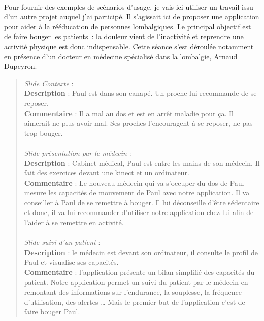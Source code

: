 \paragraph{}Pour fournir des exemples de scénarios d'usage, je vais ici utiliser un travail issu d'un autre projet auquel j'ai participé. Il s'agissait ici de proposer une application pour aider à la rééducation de personnes lombalgiques. Le principal objectif est de faire bouger les patients~: la douleur vient de l'inactivité et reprendre une activité physique est donc indispensable. Cette séance s'est déroulée notamment en présence d'un docteur en médecine spécialisé dans la lombalgie, Arnaud Dupeyron.

\begin{quotation}
	\emph{Slide Contexte} :\\
	\textbf{Description} : Paul est dans son canapé. Un proche lui recommande de se reposer.\\
	\textbf{Commentaire} : Il a mal au dos et est en arrêt maladie pour ça. Il aimerait ne plus avoir mal. Ses proches l’encouragent à se reposer, ne pas trop bouger.
	\paragraph{}
	\emph{Slide présentation par le médecin} :\\
	\textbf{Description} : Cabinet médical, Paul est entre les mains de son médecin. Il fait des exercices devant une kinect et un ordinateur.\\
	\textbf{Commentaire} : Le nouveau médecin qui va s’occuper du dos de Paul mesure les capacités de mouvement de Paul avec notre application. Il va conseiller à Paul de se remettre à bouger. Il lui déconseille d’être sédentaire et donc, il va lui recommander d’utiliser notre application chez lui afin de l’aider à se remettre en activité.
	\paragraph{}
	\emph{Slide suivi d’un patient} :\\
	\textbf{Description} : le médecin est devant son ordinateur, il consulte le profil de Paul et visualise ses capacités.\\
	\textbf{Commentaire} : l’application présente un bilan simplifié des capacités du patient. Notre application permet un suivi du patient par le médecin en remontant des informations sur l’endurance, la souplesse, la fréquence d’utilisation, des alertes … Mais le premier but de l’application c’est de faire bouger Paul.
\end{quotation}

